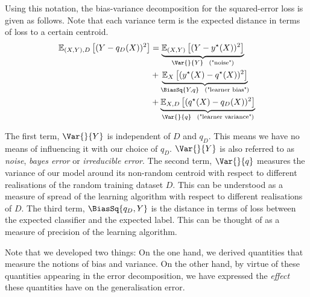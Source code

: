 \documentclass[
	twoside=false, %
]{kaobook}
\begin{document}
Using this notation, the bias-variance decomposition for the squared-error loss is given as follows.
Note that each variance term is the expected distance in terms of loss to a certain centroid.
\begin{align} \label{thm:sqerr-bias-variance-decomp}
\mathbb{E}_{(X,Y), D}\left[ (Y-q_{D}(X))^2 \right]  
&= \underbrace{\mathbb{E}_{(X,Y)}\left[ (Y-y^\star(X))^2 \right]   }_{\Var{}{Y} ~~ \text{("noise")}} \\
&+ \underbrace{ \mathbb{E}_{X}\left[  (y^\star(X) - q^\star(X))^2\right]  }_{\BiasSq{Y, q} ~~ \text{("learner bias")}} \\
&+ \underbrace{\mathbb{E}_{X, D}\left[ (q^\star(X) - q_{D}(X))^2 \right]   }_{\Var{}{q} ~~ \text{("learner variance")}}
\end{align}

The first term, $\Var{}{Y}$ is independent of $D$ and $q_{D}$. This means we have no means of influencing it with our choice of $q_{D}$.
$\Var{}{Y}$ is also referred to as \textit{noise}, \textit{bayes error} or \textit{irreducible error}. 
The second term, $\Var{}{q}$ measures the variance of our model around its non-random centroid with respect to different realisations of the random training dataset $D$. This can be understood as a measure of spread of the learning algorithm with respect to different realisations of $D$.
The third term, $\BiasSq{q_{D}, Y}$ is the distance in terms of loss between the expected classifier and the expected label. This can be thought of as a measure of precision of the learning algorithm. 

Note that we developed two things:
On the one hand, we derived quantities that measure the notions of bias and variance. On the other hand, by virtue of these quantities appearing in the error decomposition, we have expressed the \textit{effect} these quantities have on the generalisation error.
\end{document}
